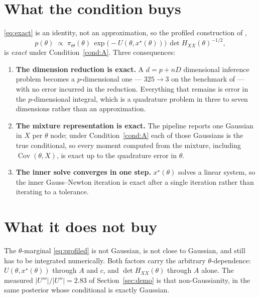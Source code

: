 \documentclass[11pt]{article}
\newcommand{\Hxx}{H_{\!X\!X}}
\newcommand{\xstar}{x^{\star}}
\theoremstyle{plain}
\theoremstyle{definition}
\theoremstyle{remark}
\begin{document}
\section{What the condition buys}
\label{sec:buy}

\eqref{eq:exact} is an identity, not an approximation, so the profiled construction of
\cite{companion2},
\begin{equation}
\label{eq:profiled}
  p(\theta) \;\propto\; \pi_\Theta(\theta)\,
  \exp\!\big(-U(\theta, \xstar(\theta))\big)\, \det \Hxx(\theta)^{-1/2},
\end{equation}
is \emph{exact} under Condition~\ref{cond:A}. Three consequences:

\begin{enumerate}[leftmargin=1.6em,itemsep=3pt]
\item \textbf{The dimension reduction is exact.} A $d = p + nD$ dimensional inference problem
becomes a $p$-dimensional one --- $325 \to 3$ on the benchmark of \cite{companion1} --- with no
error incurred in the reduction. Everything that remains is error in the $p$-dimensional integral,
which is a quadrature problem in three to seven dimensions rather than an approximation.
\item \textbf{The mixture representation is exact.} The pipeline reports one Gaussian in $X$ per
$\theta$ node; under Condition~\ref{cond:A} each of those Gaussians is the true conditional, so
every moment computed from the mixture, including $\operatorname{Cov}(\theta, X)$, is exact up to
the quadrature error in $\theta$.
\item \textbf{The inner solve converges in one step.} $\xstar(\theta)$ solves a linear system, so
the inner Gauss--Newton iteration is exact after a single iteration rather than iterating to a
tolerance.
\end{enumerate}

\section{What it does not buy}
\label{sec:notbuy}

The $\theta$-marginal \eqref{eq:profiled} is not Gaussian, is not close to Gaussian, and still has
to be integrated numerically. Both factors carry the arbitrary $\theta$-dependence:
$U(\theta,\xstar(\theta))$ through $A$ and $c$, and $\det\Hxx(\theta)$ through $A$ alone. The
measured $|U'''|/|U''| = 2.83$ of Section~\ref{sec:demo} is that non-Gaussianity, in the same
posterior whose conditional is exactly Gaussian.
\end{document}
